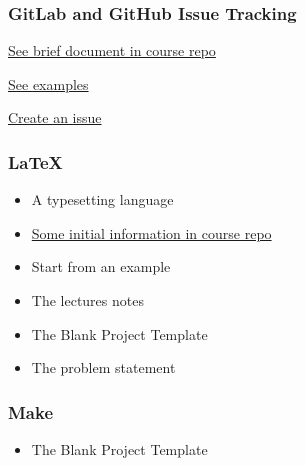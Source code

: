 \documentclass[t,12pt,numbers,fleqn]{beamer}
\begin{document}

\begin{frame}
\frametitle{GitLab and GitHub Issue Tracking}

\bi
\item \href{https://gitlab.cas.mcmaster.ca/smiths/cas741/tree/master/ToolTutorials/gitAndGitLab}{See brief document in course repo}
\item \href{https://github.com/JacquesCarette/literate-scientific-software/issues}{See
  examples}
\item \href{https://gitlab.cas.mcmaster.ca/smiths/cas741/issues}{Create an issue}
\ei

\end{frame}


\begin{frame}
\frametitle{LaTeX}
\begin{itemize}
\item A typesetting language
\item \href{https://gitlab.cas.mcmaster.ca/smiths/cas741/tree/master/ToolTutorials/LaTeX}{Some initial information in course repo}
\item Start from an example
\bi
\item The lectures notes
\item The Blank Project Template
\item The problem statement
\ei
\end{itemize}
\end{frame}


\begin{frame}
\frametitle{Make}
\begin{itemize}
\item The Blank Project Template
\end{itemize}
\end{frame}

\end{document}
